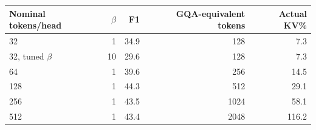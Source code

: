 \begin{tabular}{@{}lrrrr@{}}
\toprule
Nominal tokens/head & $\beta$ & F1 & GQA-equivalent tokens & Actual KV\% \\
\midrule
32 & 1 & 34.9 & 128 & 7.3 \\
32, tuned $\beta$ & 10 & 29.6 & 128 & 7.3 \\
64 & 1 & 39.6 & 256 & 14.5 \\
128 & 1 & 44.3 & 512 & 29.1 \\
256 & 1 & 43.5 & 1024 & 58.1 \\
512 & 1 & 43.4 & 2048 & 116.2 \\
\bottomrule
\end{tabular}
